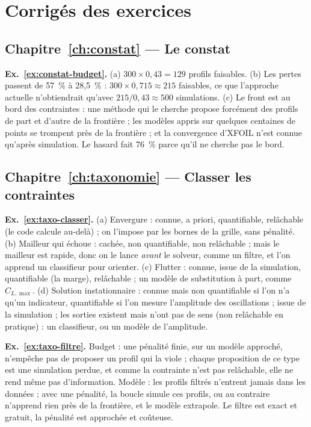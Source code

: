 \chapter{Corrigés des exercices}\label{annexe:corriges}

\section*{Chapitre~\ref{ch:constat} — Le constat}
\textbf{Ex.~\ref{ex:constat-budget}.} (a) $300\times0{,}43=129$ profils faisables. (b) Les pertes passent de 57~\% à 28,5~\% : $300\times0{,}715\approx215$ faisables, ce que l'approche actuelle n'obtiendrait qu'avec $215/0{,}43\approx500$ simulations. (c) Le front est au bord des contraintes : une méthode qui le cherche propose forcément des profils de part et d'autre de la frontière ; les modèles appris sur quelques centaines de points se trompent près de la frontière ; et la convergence d'XFOIL n'est connue qu'après simulation. Le hasard fait 76~\% parce qu'il ne cherche pas le bord.

\section*{Chapitre~\ref{ch:taxonomie} — Classer les contraintes}
\textbf{Ex.~\ref{ex:taxo-classer}.} (a) Envergure : connue, a priori, quantifiable, relâchable (le code calcule au-delà) ; on l'impose par les bornes de la grille, sans pénalité. (b) Mailleur qui échoue : cachée, non quantifiable, non relâchable ; mais le mailleur est rapide, donc on le lance \emph{avant} le solveur, comme un filtre, et l'on apprend un classifieur pour orienter. (c) Flutter : connue, issue de la simulation, quantifiable (la marge), relâchable ; un modèle de substitution à part, comme $C_{L,\max}$. (d) Solution instationnaire : connue mais non quantifiable si l'on n'a qu'un indicateur, quantifiable si l'on mesure l'amplitude des oscillations ; issue de la simulation ; les sorties existent mais n'ont pas de sens (non relâchable en pratique) : un classifieur, ou un modèle de l'amplitude.

\textbf{Ex.~\ref{ex:taxo-filtre}.} Budget : une pénalité finie, sur un modèle approché, n'empêche pas de proposer un profil qui la viole ; chaque proposition de ce type est une simulation perdue, et comme la contrainte n'est pas relâchable, elle ne rend même pas d'information. Modèle : les profils filtrés n'entrent jamais dans les données ; avec une pénalité, la boucle simule ces profils, ou au contraire n'apprend rien près de la frontière, et le modèle extrapole. Le filtre est exact et gratuit, la pénalité est approchée et coûteuse.

